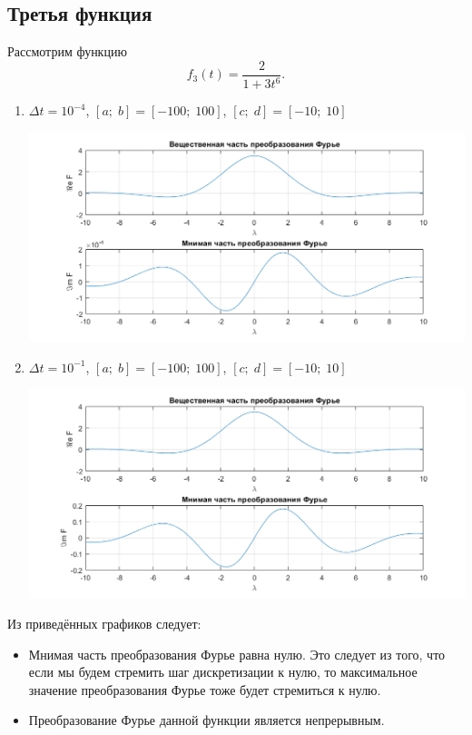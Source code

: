 \documentclass[a4paper, 11pt]{article}
\begin{document}
    \subsection{Третья функция}
        Рассмотрим функцию        
        $$
            f_3(t)=\frac{2}{1+3t^6}.
        $$
        \begin{enumerate}
            \item
                $\Delta t = 10^{-4}$, $[a;\; b] = [-100;\; 100]$, $[c;\;d] = [-10;\;10]$
                
                \includegraphics[width=\linewidth]{img/7.png}
            \item
                $\Delta t = 10^{-1}$, $[a;\; b] = [-100;\; 100]$, $[c;\;d] = [-10;\;10]$
                
                \includegraphics[width=\linewidth]{img/8.png}
        \end{enumerate}
        
        Из приведённых графиков следует:
        \begin{itemize}
            \item
                Мнимая часть преобразования Фурье равна нулю. Это следует из того, что если мы будем стремить шаг дискретизации к нулю, то максимальное значение преобразования Фурье тоже будет стремиться к нулю.
            \item
                Преобразование Фурье данной функции является непрерывным.
        \end{itemize}
\end{document}
